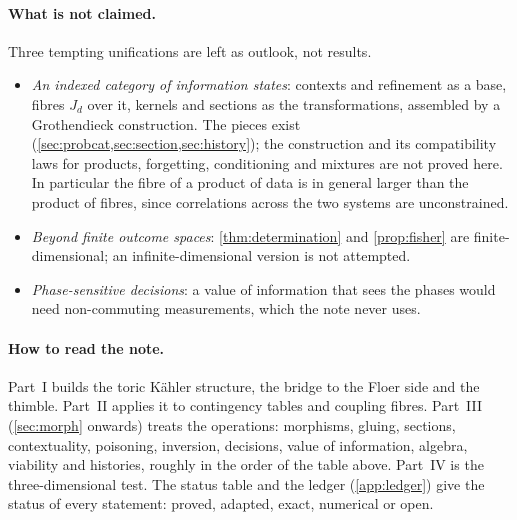 \documentclass[11pt]{article}
\theoremstyle{definition}\newtheorem{definition}[theorem]{Definition}\newtheorem{remark}[theorem]{Remark}\newtheorem{example}[theorem]{Example}\newtheorem{problem}[theorem]{Open problem}\crefname{problem}{Problem}{Problems}
\begin{document}
\paragraph{What is not claimed.} Three tempting unifications are left as outlook, not results.
\begin{itemize}
\item \emph{An indexed category of information states}: contexts and refinement as a base, fibres $J_d$ over it, kernels and sections as the transformations, assembled by a Grothendieck construction. The pieces exist (\cref{sec:probcat,sec:section,sec:history}); the construction and its compatibility laws for products, forgetting, conditioning and mixtures are not proved here. In particular the fibre of a product of data is in general larger than the product of fibres, since correlations across the two systems are unconstrained.
\item \emph{Beyond finite outcome spaces}: \cref{thm:determination} and \cref{prop:fisher} are finite-dimensional; an infinite-dimensional version is not attempted.
\item \emph{Phase-sensitive decisions}: a value of information that sees the phases would need non-commuting measurements, which the note never uses.
\end{itemize}

\paragraph{How to read the note.} Part~I builds the toric K\"ahler structure, the bridge to the Floer side and the thimble. Part~II applies it to contingency tables and coupling fibres. Part~III (\cref{sec:morph} onwards) treats the operations: morphisms, gluing, sections, contextuality, poisoning, inversion, decisions, value of information, algebra, viability and histories, roughly in the order of the table above. Part~IV is the three-dimensional test. The status table and the ledger (\cref{app:ledger}) give the status of every statement: proved, adapted, exact, numerical or open.
\end{document}
